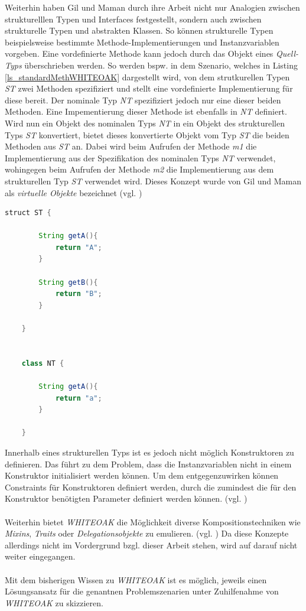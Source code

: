 \documentclass[11pt, 
ngerman,
doublespacing,
chapterinoneline, %
consistentlayout, %
]{scrartcl}
\begin{document}
Weiterhin haben Gil und Maman \cite{whiteoak} durch ihre Arbeit nicht nur Analogien zwischen strukturelllen Typen und Interfaces festgestellt, sondern auch zwischen strukturelle Typen und abstrakten Klassen. So können strukturelle Typen beispielsweise bestimmte Methode-Implementierungen und Instanzvariablen vorgeben. Eine vordefinierte Methode kann jedoch durch das Objekt eines \emph{Quell-Typs} überschrieben werden. So werden bspw. in dem Szenario, welches in Listing \ref{ls_standardMethWHITEOAK} dargestellt wird, von dem strutkurellen Typen \emph{ST} zwei Methoden spezifiziert und stellt eine vordefinierte Implementierung für diese bereit. Der nominale Typ \emph{NT} spezifiziert jedoch nur eine dieser beiden Methoden. Eine Impementierung dieser Methode ist ebenfalls in \emph{NT} definiert. Wird nun ein Objekt des nominalen Typs \emph{NT} in ein Objekt des strukturellen Typs \emph{ST} konvertiert, bietet dieses konvertierte Objekt vom Typ \emph{ST} die beiden Methoden aus \emph{ST} an. Dabei wird beim Aufrufen der Methode \emph{m1} die Implementierung aus der Spezifikation des nominalen Typs \emph{NT} verwendet, wohingegen beim Aufrufen der Methode \emph{m2} die Implementierung aus dem strukturellen Typ \emph{ST} verwendet wird. Dieses Konzept wurde von Gil und Maman als \emph{virtuelle Objekte} bezeichnet (vgl. \cite{whiteoak})
\begin{lstlisting}[caption =Standardmethoden in WHITEOAK, language=Java, label=ls_standardMethWHITEOAK ]
	struct ST {
	
		String getA(){
			return "A";
		}
		
		String getB(){
			return "B";
		}

	}

	
	class NT {

		String getA(){
			return "a";
		}	

	}
\end{lstlisting}
Innerhalb eines strukturellen Typs ist es jedoch nicht möglich Konstruktoren zu definieren. Das führt zu dem Problem, dass die Instanzvariablen nicht in einem Konstruktor initialisiert werden können. Um dem entgegenzuwirken können Constraints für Konstruktoren definiert werden, durch die zumindest die für den Konstruktor benötigten Parameter definiert werden können. (vgl. \cite{whiteoak})\\\\
Weiterhin bietet \emph{WHITEOAK} die Möglichkeit diverse Kompositionstechniken wie \emph{Mixins}, \emph{Traits} oder \emph{Delegationsobjekte} zu emulieren. (vgl. \cite{whiteoak}) Da diese Konzepte allerdings nicht im Vordergrund bzgl. dieser Arbeit stehen, wird auf darauf nicht weiter eingegangen.\\\\
Mit dem bisherigen Wissen zu \emph{WHITEOAK} ist es möglich, jeweils einen Lösungsansatz für die genantnen Problemszenarien unter Zuhilfenahme von \emph{WHITEOAK} zu skizzieren.
\end{document}
